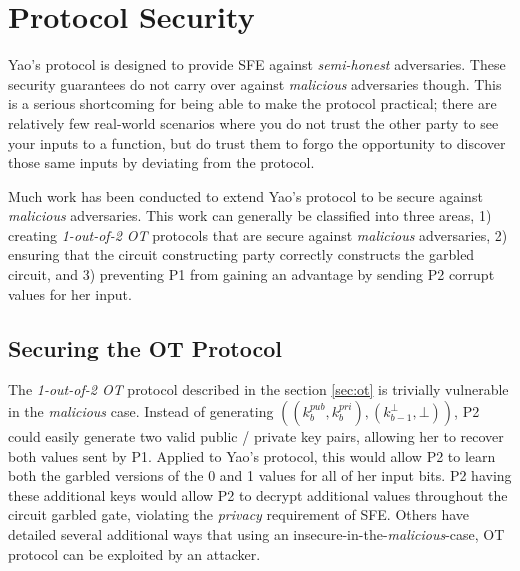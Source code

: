 \section{Protocol Security}
\label{sec:security}

Yao's protocol is designed to provide \ac{SFE} against \emph{semi-honest} adversaries. These security guarantees do not carry over against \emph{malicious} adversaries though.  This is a serious shortcoming for being able to make the protocol practical; there are relatively few real-world scenarios where you do not trust the other party to see your inputs to a function, but do trust them to forgo the opportunity to discover those same inputs by deviating from the protocol.

Much work has been conducted to extend Yao's protocol to be secure against \emph{malicious} adversaries.  This work can generally be classified into three areas, 1) creating \emph{1-out-of-2 \ac{OT}} protocols that are secure against \emph{malicious} adversaries, 2) ensuring that the circuit constructing party correctly constructs the garbled circuit, and 3) preventing \ac{P1} from gaining an advantage by sending \ac{P2} corrupt values for her input.

\subsection{Securing the \ac{OT} Protocol}
\label{sec:securingot}

The \emph{1-out-of-2 \ac{OT}} protocol described in the section \ref{sec:ot} is trivially vulnerable in the \emph{malicious} case.  Instead of generating $((k^{pub}_b, k^{pri}_b), (k^\bot_{b-1}, \bot))$, \ac{P2} could easily generate two valid public / private key pairs, allowing her to recover both values sent by \ac{P1}. Applied to Yao's protocol, this would allow \ac{P2} to learn both the garbled versions of the 0 and 1 values for all of her input bits. \ac{P2} having these additional keys would allow \ac{P2} to decrypt additional values throughout the circuit garbled gate, violating the \emph{privacy} requirement of \ac{SFE}.  Others have detailed several additional ways that using an insecure-in-the-\emph{malicious}-case, \ac{OT} protocol can be exploited by an attacker\cite{kiraz2006protocol}.

